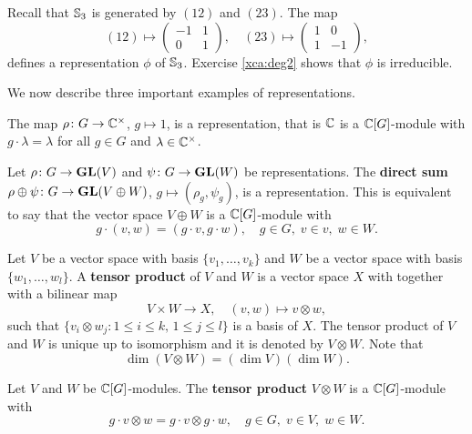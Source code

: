 \begin{example}
  Recall that $\mathbb{S}_3$ is generated by $(12)$ and $(23)$. The map 
  \[(12)\mapsto\begin{pmatrix}
    -1 & 1\\
    0 & 1
  \end{pmatrix},
  \quad
  (23)\mapsto\begin{pmatrix}
    1 & 0\\
    1 & -1
  \end{pmatrix},
  \]
  defines a representation $\phi$ of $\mathbb{S}_3$. 
  Exercise \ref{xca:deg2} shows that $\phi$ is  
  irreducible.
\end{example}

We now describe three important examples of representations. 

\begin{example} 
    The map $\rho\colon G\to\mathbb{C}^{\times}$, $g\mapsto 1$, 
    is a representation, that is $\mathbb{C}$ is a $\mathbb{C}[G]$-module with
    $g\cdot \lambda=\lambda$ for all $g\in G$ 
    and $\lambda\in\mathbb{C}^{\times}$.
\end{example}

\begin{example}
    Let $\rho\colon G\to\mathbf{GL}(V)$ and 
    $\psi\colon G\to\mathbf{GL}(W)$ be representations. The \textbf{direct sum} 
    $\rho\oplus\psi\colon G\to\mathbf{GL}(V\oplus W)$, $g\mapsto (\rho_g,\psi_g)$, 
    is a representation. This is equivalent to say that
    the vector space $V\oplus W$ is a $\mathbb{C}[G]$-module with
    \[
    g\cdot (v,w)=(g\cdot v,g\cdot w),\quad
    g\in G,\;v\in v,\;w\in W.
    \]
\end{example}

Let $V$ be a vector space with basis $\{v_1,\dots,v_k\}$ and 
$W$ be a vector space with basis $\{w_1,\dots,w_l\}$. A 
\textbf{tensor product} of $V$ and $W$ is a vector space $X$ with 
together with a bilinear map 
\[
V\times W\to X,
\quad
(v,w)\mapsto v\otimes w,
\]
such that $\{v_i\otimes w_j:1\leq i\leq k,\,1\leq j\leq l\}$ is a  
basis of $X$. The tensor product of $V$ and $W$ is unique up to isomorphism 
and it is denoted by $V\otimes W$. Note that
\[
\dim(V\otimes W)=(\dim V)(\dim W).
\]


\begin{example}
    Let $V$ and $W$ be $\mathbb{C}[G]$-modules. The \textbf{tensor product}
    $V\otimes W$
    is a $\mathbb{C}[G]$-module 
    with
    \[
    g\cdot v\otimes w=g\cdot v\otimes g\cdot w,
    \quad
    g\in G,\;v\in V,\;w\in W.
    \]
\end{example}

